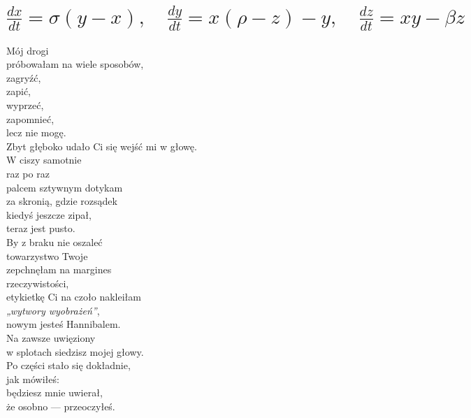 \documentclass[12pt, a4paper]{memoir}
\renewenvironment{verse}{%
  \par\vspace{\baselineskip}\raggedright
}{
  \par\vspace{\baselineskip}
}
\begin{document}
\section[Układ Lorenza]{%
$ \frac{dx}{dt} = \sigma(y - x), \quad \frac{dy}{dt} = x(\rho - z) - y, \quad \frac{dz}{dt} = xy - \beta z $%
}
\begin{verse}
Mój drogi\\
próbowałam na wiele sposobów,\\
zagryźć,\\
zapić,\\
wyprzeć,\\
zapomnieć,\\
lecz nie mogę.\\
Zbyt głęboko udało Ci się wejść mi w głowę.\\[\baselineskip]

W ciszy samotnie\\
raz po raz\\
palcem sztywnym dotykam\\
za skronią, gdzie rozsądek\\
kiedyś jeszcze zipał,\\
teraz jest pusto.\\[\baselineskip]

By z braku nie oszaleć\\
towarzystwo Twoje\\
zepchnęłam na margines\\
rzeczywistości,\\
etykietkę Ci na czoło nakleiłam\\
\textit{„wytwory wyobrażeń”},\\
nowym jesteś Hannibalem.\\
Na zawsze uwięziony\\
w splotach siedzisz mojej głowy.\\[\baselineskip]

Po części stało się dokładnie,\\
jak mówiłeś:\\
będziesz mnie uwierał,\\
że osobno --- przeoczyłeś.
\end{verse}

\clearpage
\end{document}
